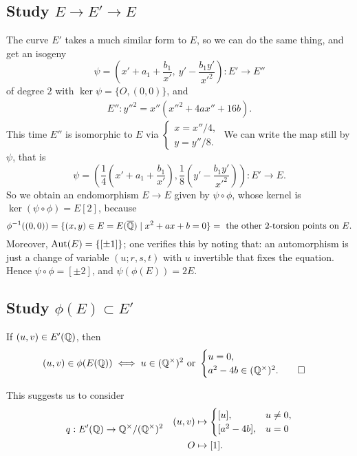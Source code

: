 \subsection*{Study $E\to E'\to E$}
The curve $E'$ takes a much similar form to $E$,
so we can do the same thing, and get an isogeny \[\psi = \left( 
    x' + a_1 + \frac{b_1}{x'},\ y' - \frac{b_1y'}{x'^2}
 \right) : E'\to E''\]
of degree $2$ with $\ker\psi = \{O, (0, 0)\}$, and \begin{align*}
    E'' : y''^2 = x''(x''^2  + 4ax'' + 16b ).
\end{align*}
This time $E''$ is isomorphic to $E$ via \(\begin{cases}
    x = x''/4, \\ y = y''/8.
\end{cases}\)
We can write the map still by $\psi$, that is
\[\psi = \left( \frac{1}{4}\left( x' + a_1 + \frac{b_1}{x'} \right),
\frac{1}{8}\left( y' - \frac{b_1y'}{x'^2} \right) \right) : E'\to E.\]
So we obtain an endomorphism $E\to E$ given by $\psi\circ\phi$, whose kernel is $\ker (\psi\circ\phi) = E[2]$,
because \[\phi^{-1}((0, 0)) = \{(x, y)\in E = E(\overline{\mathbb{Q}})\mid x^2 + ax + b = 0\} = \text{ the other 2-torsion points on }E.\]
Moreover, $\operatorname{Aut}(E) = \{[\pm 1]\}$;
one verifies this by noting that: an automorphism is just a change of variable $(u; r, s, t)$ with $u$ invertible that fixes the equation.
Hence $\psi\circ\phi = [\pm 2]$,
and $\psi(\phi(E)) = 2E$.

\subsection*{Study \texorpdfstring{$\phi(E)\subset E'$}{phi(E)}}
\begin{lemma}
    If $(u, v)\in E'(\mathbb{Q})$,
    then \[(u, v)\in\phi(E(\mathbb{Q}))\iff u\in(\mathbb{Q}^\times)^2\text{ or }\begin{cases}
        u = 0, \\ a^2 - 4b\in (\mathbb{Q}^\times)^2.\qedhere
    \end{cases}\]
\end{lemma}

This suggests us to consider \[q : E'(\mathbb{Q})\to\mathbb{Q}^\times/(\mathbb{Q}^\times)^2\quad \begin{aligned}
    (u, v) &\mapsto\begin{cases}
        [u], & u\ne 0,\\ [a^2 - 4b], & u = 0
    \end{cases}\\
    O&\mapsto [1].
\end{aligned}\]

